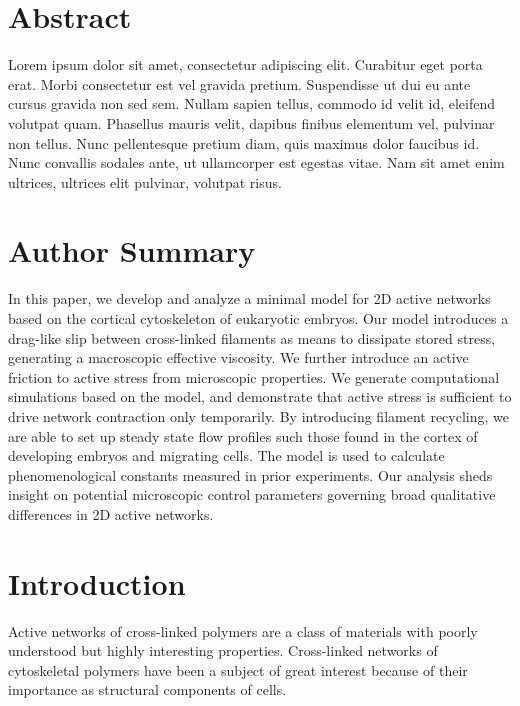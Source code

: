 \documentclass[10pt,letterpaper]{article}
\begin{document}
\section*{Abstract}
Lorem ipsum dolor sit amet, consectetur adipiscing elit. Curabitur eget porta erat. Morbi consectetur est vel gravida pretium. Suspendisse ut dui eu ante cursus gravida non sed sem. Nullam sapien tellus, commodo id velit id, eleifend volutpat quam. Phasellus mauris velit, dapibus finibus elementum vel, pulvinar non tellus. Nunc pellentesque pretium diam, quis maximus dolor faucibus id. Nunc convallis sodales ante, ut ullamcorper est egestas vitae. Nam sit amet enim ultrices, ultrices elit pulvinar, volutpat risus.


\section*{Author Summary}
In this paper, we develop and analyze a minimal model for 2D active networks based on the cortical cytoskeleton of eukaryotic embryos.  Our model introduces a drag-like slip between cross-linked filaments as means to dissipate stored stress, generating a macroscopic effective viscosity.  We further introduce an active friction to active stress from microscopic properties.  We generate computational simulations based on the model, and demonstrate that active stress is sufficient to drive network contraction only temporarily.  By introducing filament recycling, we are able to set up steady state flow profiles such those found in the cortex of developing embryos and migrating cells.  The model is used to calculate phenomenological constants measured in prior experiments.  Our analysis sheds insight on potential microscopic control parameters governing broad qualitative differences in 2D active networks.

\linenumbers

\section*{Introduction}

Active networks of cross-linked polymers are a class of materials with poorly understood but highly interesting properties.  Cross-linked networks of cytoskeletal polymers have been a subject of great interest because of their importance as structural components of cells\cite{cellmech_review1,cellmech_review2}.  
\end{document}
